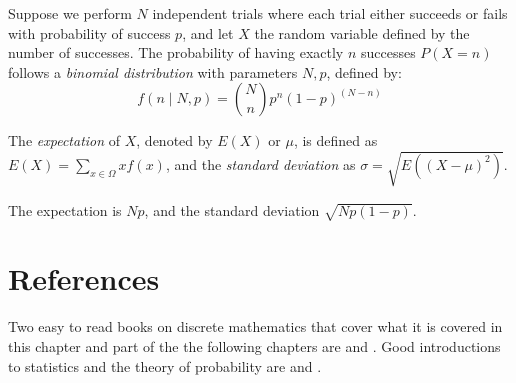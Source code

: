 \begin{example}
Suppose we perform $N$ independent trials where each trial either succeeds or fails with probability of success $p$, and let $X$ the random variable defined by the number of successes. The probability of having exactly $n$ successes $P(X=n)$ follows a \emph{binomial distribution} with parameters $N, p$, defined by:
\[
f(n\mid N, p) = \binom{N}{n} p^n (1-p)^{(N-n)}
\]
\end{example}

The \emph{expectation} of $X$, denoted by $E(X)$ or $\mu$, is defined as $E(X) = \sum_{x \in \Omega} x f(x)$, and the \emph{standard deviation} as $\sigma = \sqrt{E \left( (X - \mu)^2 \right)}$.

\begin{example}
The expectation is $Np$, and the standard deviation $\sqrt{Np(1-p)}$.
\end{example}



\section*{References}

Two easy to read books on discrete mathematics that cover what it is covered in this chapter and part of the the following chapters are \cite{rosen1995discrete} and \cite{epp2010discrete}. Good introductions to statistics and the theory of probability are \cite{degroot1986probability} and \cite{spiegel2012probability}.
